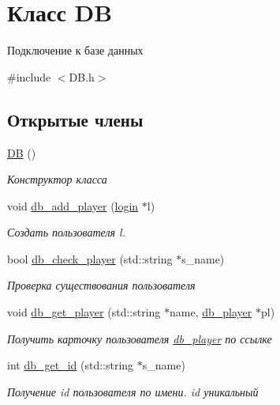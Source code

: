 \hypertarget{class_d_b}{}\section{Класс DB}
\label{class_d_b}


Подключение к базе данных  




{\ttfamily \#include $<$D\+B.\+h$>$}

\subsection*{Открытые члены}
\begin{DoxyCompactItemize}
\item 
\mbox{\hyperlink{group__dbcpp_ga29a603c52c10831cddee82518417f992}{DB}} ()
\begin{DoxyCompactList}\small\item\em Конструктор класса \end{DoxyCompactList}\item 
void \mbox{\hyperlink{group__dbcpp_ga472c425f9a22c467e4acd0e800153837}{db\+\_\+add\+\_\+player}} (\mbox{\hyperlink{structlogin}{login}} $\ast$l)
\begin{DoxyCompactList}\small\item\em Создать пользователя l. \end{DoxyCompactList}\item 
bool \mbox{\hyperlink{group__dbcpp_gaea6044c3fffc4c31714c732bb3789f71}{db\+\_\+check\+\_\+player}} (std\+::string $\ast$s\+\_\+name)
\begin{DoxyCompactList}\small\item\em Проверка существования пользователя \end{DoxyCompactList}\item 
void \mbox{\hyperlink{group__dbcpp_ga1e5d244a838c99a8753727cf0abd1f70}{db\+\_\+get\+\_\+player}} (std\+::string $\ast$name, \mbox{\hyperlink{structdb__player}{db\+\_\+player}} $\ast$pl)
\begin{DoxyCompactList}\small\item\em Получить карточку пользователя \mbox{\hyperlink{structdb__player}{db\+\_\+player}} по ссылке \end{DoxyCompactList}\item 
int \mbox{\hyperlink{group__dbcpp_gaa8cdb5ec4f2f269d13cff52b9e47c4cb}{db\+\_\+get\+\_\+id}} (std\+::string $\ast$s\+\_\+name)
\begin{DoxyCompactList}\small\item\em Получение id пользователя по имени. id уникальный \end{DoxyCompactList}\item 

\end{DoxyCompactItemize}
